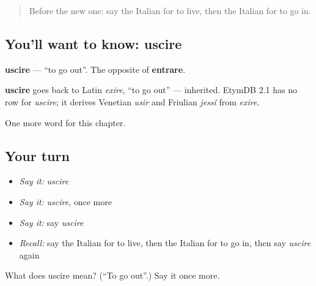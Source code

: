 \begin{quote}
Before the new one: say the Italian for to live, then the Italian for to go in.
\end{quote}

\subsection*{You'll want to know: uscire}
\textbf{uscire} — \textquotedblleft{}to go out\textquotedblright{}. The opposite of \textbf{entrare}.

\begin{cousinweb}
\textbf{uscire} goes back to Latin \emph{exire}, \textquotedblleft{}to go out\textquotedblright{} — inherited. EtymDB 2.1 has no row for \emph{uscire}; it derives Venetian \emph{usir} and Friulian \emph{jessî} from \emph{exire}.
\end{cousinweb}

\begin{grammarlens}[title={What you've built}]
One more word for this chapter.
\end{grammarlens}

\subsection*{Your turn}
\begin{itemize}
\raggedright
  \item \emph{Say it:} \emph{uscire}
  \item \emph{Say it:} \emph{uscire}, once more
  \item \emph{Say it:} say \emph{uscire}
  \item \emph{Recall:} say the Italian for to live, then the Italian for to go in, then say \emph{uscire} again
\end{itemize}

\begin{tcolorbox}[breakable,colback=teal!4,colframe=teal!35!black,title={Before you move on}]
What does uscire mean? (\textquotedblleft{}To go out\textquotedblright{}.) Say it once more.
\end{tcolorbox}
